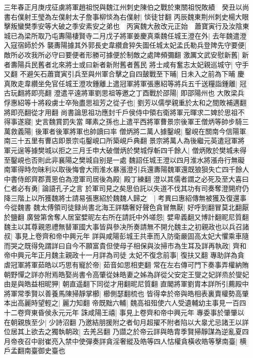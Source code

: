 三年春正月庚戌征虜將軍趙祖悦與魏江州刺史陳伯之戰於東關祖悦敗績　癸丑以尚書右僕射王瑩為左僕射太子詹事柳惔為右僕射|{
	惔徒甘翻}
丙辰魏東荆州刺史楊大眼擊叛蠻樊季安等大破之季安素安之弟也　丙寅魏大赦改元正始　蕭寶寅行及汝陰東城已為梁所取乃屯夀陽棲賢寺二月戊子將軍姜慶真乘魏任城王澄在外|{
	去年魏遣澄入寇宿師於外}
襲夀陽據其外郭長史韋纘倉猝失圖任城太妃孟氏勒兵登陴先守要便|{
	敵所必攻我所必守曰要便者形勝可據便於制敵之處陴頻彌翻}
激厲文武安慰新舊|{
	新者夀陽兵民舊者北來將士或曰新者新附舊者舊民}
將士咸有奮志太妃親巡城守|{
	守手又翻}
不避矢石蕭寶寅引兵至與州軍合擊之自四皷戰至下晡|{
	日未入之前為下晡}
慶真敗走韋纘坐免官任城王澄攻鍾離上遣冠軍將軍張惠紹等將兵五千送糧詣鍾離|{
	冠古玩翻將即亮翻}
澄遣平遠將軍劉思祖等邀之丁酉戰於邵陽|{
	即邵陽州也}
大敗梁兵俘惠紹等十將殺虜士卒殆盡思祖芳之從子也|{
	劉芳以儒學親重於太和之間敗補邁翻將即亮翻從才用翻}
尚書論思祖功應封千戶侯侍中領右衛將軍元暉求二婢於思祖不得事遂寢|{
	史言魏賞罰失當}
暉素之孫也上遣平西將軍曹景宗後軍王僧炳等帥步騎三萬救義陽|{
	後軍者後軍將軍也帥讀曰率}
僧炳將二萬人據鑿峴|{
	鑿峴在關南今信陽軍南三十五里有曹店即景宗屯鑿峴口所築峴戶典翻}
景宗將萬人為後繼元英遣冠軍將軍元逞等據樊城以拒之三月壬申大破僧炳於樊城俘斬四千餘人|{
	僧炳敗於樊城未得至鑿峴也否則此非襄陽之樊城自别是一處}
魏詔任城王澄以四月淮水將漲舟行無礙南軍得時勿昧利以取後悔會大雨淮水暴漲澄引兵還夀陽魏軍還既狼狽失亡四千餘人中書侍郎齊郡賈思伯為澄軍司居後為殿|{
	殿丁練翻}
澄以其儒者謂之必死及至大喜曰仁者必有勇|{
	論語孔子之言}
於軍司見之矣思伯託以失道不伐其功有司奏奪澄開府仍降三階上以所獲魏將士請易張惠紹於魏魏人歸之　|{
	考異曰惠紹傳無被獲及復還事今從魏書}
魏太傅領司徒録尚書北海王詳驕奢好聲色貪冒無厭|{
	好呼到翻冒莫北翻厭於鹽翻}
廣營第舍奪人居室嬖昵左右所在請託中外嗟怨|{
	嬖卑義翻又博計翻昵尼質翻}
魏主以其尊親恩禮無替軍國大事皆與參决所奏請無不開允魏主之初親政也以兵召諸叔|{
	事見上卷齊和帝中興元年}
詳與咸陽彭城王共車而入防衛嚴固高太妃大懼乘車隨而哭之既得免謂詳曰自今不願富貴但使母子相保與汝掃市為生耳及詳再執政|{
	齊和帝中興元年正月魏主親政十一月詳為司徒}
太妃不復念前事|{
	復扶又翻}
專助詳為貪虐冠軍將軍茹皓以巧思有寵於帝|{
	茹音如思相吏翻}
常在左右傳可門下奏事弄權納賄朝野憚之詳亦附焉皓娶尚書令高肇從妹皓妻之姊為詳從父安定王燮之妃詳烝於燮妃由是與皓益相昵狎|{
	朝直遥翻下同從才用翻昵尼質翻}
直閣將軍劉胄本詳所引薦殿中將軍常季賢以善養馬陳掃靜掌櫛|{
	櫛側瑟翻梳也}
皆得幸於帝與皓相表裏賣權勢高肇本出高麗時望輕之|{
	麗力知翻}
帝既黜六輔|{
	魏高祖殂使六人受遺輔幼主事見一百四十二卷齊東昏侯永元元年}
誅咸陽王禧|{
	事見上卷齊和帝中興元年}
專委事於肇肇以在朝親族至少|{
	少詩沼翻}
乃邀結朋援附之者旬月超擢不附者陷以大辠尤忌諸王以詳位居其上欲去之獨執朝政|{
	去羌呂翻}
乃譛之於帝云詳與皓胄季賢掃靜謀為逆亂夏四月帝夜召中尉崔亮入禁中使彈奏詳貪淫奢縱及皓等四人怙權貪橫收皓等擊南臺|{
	横戶孟翻南臺御史臺也}
